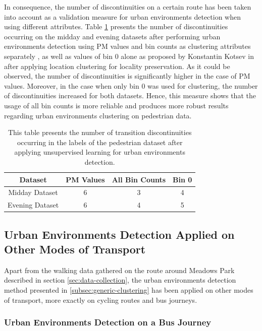 \documentclass[bsc,frontabs,twoside,singlespacing, parskip,deptreport]{infthesis}     %
\begin{document}
In consequence, the number of discontinuities on a certain route has been taken into account as a validation measure for urban environments detection when using different attributes. Table \ref{table:discontinuities-meadows} presents the number of discontinuities occurring on the midday and evening datasets after performing urban environments detection using PM values and bin counts as clustering attributes separately , as well as values of bin 0 alone as proposed by Konstantin Kotsev in \cite{Kotsev2015}after applying location clustering for locality preservation. As it could be observed, the number of discontinuities is significantly higher in the case of PM values. Moreover, in the case when only bin 0 was used for clustering, the number of discontinuities increased for both datasets. Hence, this measure shows that the usage of all bin counts is more reliable and produces more robust results regarding urban environments clustering on pedestrian data.

\begin{table}[h!]
\centering
 \begin{tabular}{||c | c | c | c||} 
 \hline
 Dataset & PM Values & All Bin Counts & Bin 0 \\ [0.5ex] 
 \hline\hline
 Midday Dataset & 6 & 3  & 4 \\ 
 \hline
 Evening Dataset & 6 & 4 & 5 \\
 \hline
\end{tabular}
\caption{This table presents the number of transition discontinuities occurring in the labels of the pedestrian dataset after applying unsupervised learning for urban environments detection.}
\label{table:discontinuities-meadows}
\end{table}


\subsection{Urban Environments Detection Applied on Other Modes of Transport}
\label{subsec:urban-envs-on-modes-of-transport}

Apart from the walking data gathered on the route around Meadows Park described in section \ref{sec:data-collection}, the urban environments detection method presented in \ref{subsec:generic-clustering} has been applied on other modes of transport, more exactly on cycling routes and bus journeys.

\subsubsection*{Urban Environments Detection on a Bus Journey}
\end{document}
